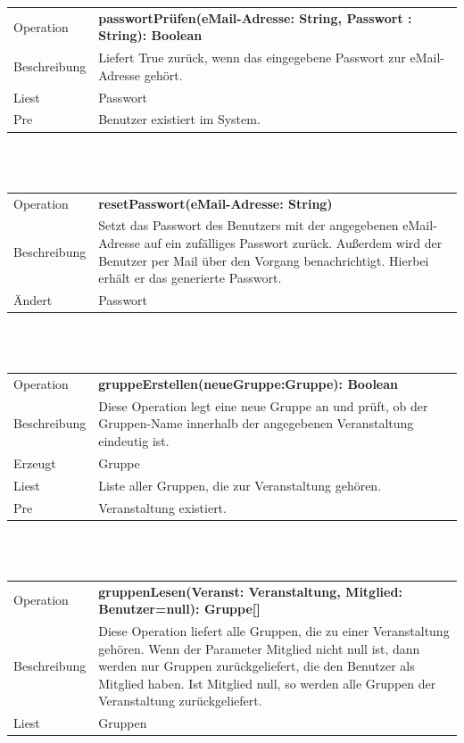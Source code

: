 \documentclass[12pt,a4paper]{article}
\begin{document}
{\begin{tabular}{|l|p{12cm}|}
	\hline
	Operation &  \textbf{passwortPrüfen(eMail-Adresse: String, Passwort : String): Boolean }\\ 
	Beschreibung & Liefert True zurück, wenn das eingegebene Passwort zur eMail-Adresse gehört.\\ 
	Liest & Passwort \\ 
	Pre & Benutzer existiert im System. \\ 
	\hline 
\end{tabular} \\\\

\begin{tabular}{|l|p{12cm}|}
	\hline
	Operation & \textbf{ resetPasswort(eMail-Adresse: String) }\\ 
	Beschreibung & Setzt das Passwort des Benutzers mit der angegebenen eMail-Adresse auf ein zufälliges Passwort zurück. Außerdem wird der Benutzer per Mail über den Vorgang benachrichtigt. Hierbei erhält er das generierte Passwort. \\ 
	Ändert & Passwort \\ 
	\hline 
\end{tabular} \\\\

\begin{tabular}{|l|p{12cm}|}
	\hline
	Operation & \textbf{ gruppeErstellen(neueGruppe:Gruppe): Boolean} \\ 
	Beschreibung & Diese Operation legt eine neue Gruppe an und prüft, ob der Gruppen-Name innerhalb der angegebenen Veranstaltung eindeutig ist.\\ 
	Erzeugt &  Gruppe\\ 
	Liest &  Liste aller Gruppen, die zur Veranstaltung gehören.\\ 
	Pre & Veranstaltung existiert. \\ 
	\hline 
\end{tabular} \\\\

\begin{tabular}{|l|p{12cm}|}
	\hline
	Operation &  \textbf{gruppenLesen(Veranst: Veranstaltung, Mitglied: Benutzer=null): Gruppe[] }\\ 
	Beschreibung & Diese Operation liefert alle Gruppen, die zu einer Veranstaltung gehören. Wenn der Parameter Mitglied nicht null ist, dann werden nur Gruppen zurückgeliefert, die den Benutzer als Mitglied haben. Ist Mitglied \glqq null\grqq, so werden alle Gruppen der Veranstaltung zurückgeliefert.\\ 
	Liest & Gruppen \\ 
	\hline 
\end{tabular} \\\\

}
\end{document}
